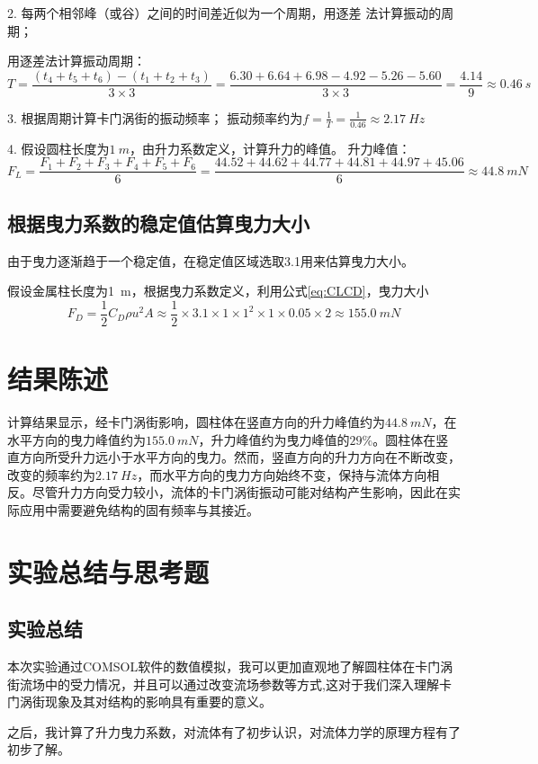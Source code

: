 \documentclass[a4paper,zihao=5,UTF8,fontset=fandol]{phyreport}
\begin{document}
2. 每两个相邻峰（或谷）之间的时间差近似为一个周期，用逐差
法计算振动的周期；

用逐差法计算振动周期：
$$T=\frac{(t_4+t_5+t_6)-(t_1+t_2+t_3)}{3\times3}=\frac{6.30+6.64+6.98-4.92-5.26-5.60}{3\times3}=\frac{4.14}{9}\approx\qty{0.46}{s}$$

3. 根据周期计算卡门涡街的振动频率；
振动频率约为$f=\frac{1}{T}=\frac{1}{0.46}\approx\qty{2.17}{Hz}$

4. 假设圆柱长度为$\qty{1}{m}$，由升力系数定义，计算升力的峰值。
升力峰值：$$F_L=\frac{F_1+F_2+F_3+F_4+F_5+F_6}{6}=\frac{44.52+44.62+44.77+44.81+44.97+45.06}{6}\approx\qty{44.8}{mN}$$

\subsection{根据曳力系数的稳定值估算曳力大小}
由于曳力逐渐趋于一个稳定值，在稳定值区域选取3.1用来估算曳力大小。

假设金属柱长度为\qty{1}{m}，根据曳力系数定义，利用公式\ref{eq:CLCD}，曳力大小
$$F_D=\frac{1}{2}C_D \rho u^2 A\approx\frac{1}{2}\times3.1\times1\times1^2\times1\times0.05\times2\approx\qty{155.0}{mN}$$


\longLine
\section{结果陈述}
计算结果显示，经卡门涡街影响，圆柱体在竖直方向的升力峰值约为$\qty{44.8}{mN}$，在水平方向的曳力峰值约为$\qty{155.0}{mN}$，升力峰值约为曳力峰值的$29\%$。圆柱体在竖直方向所受升力远小于水平方向的曳力。然而，竖直方向的升力方向在不断改变，改变的频率约为$\qty{2.17}{Hz}$，而水平方向的曳力方向始终不变，保持与流体方向相反。尽管升力方向受力较小，流体的卡门涡街振动可能对结构产生影响，因此在实际应用中需要避免结构的固有频率与其接近。

\longLine
\section{实验总结与思考题}
\subsection{实验总结}
本次实验通过COMSOL软件的数值模拟，我可以更加直观地了解圆柱体在卡门涡街流场中的受力情况，并且可以通过改变流场参数等方式,这对于我们深入理解卡门涡街现象及其对结构的影响具有重要的意义。

之后，我计算了升力曳力系数，对流体有了初步认识，对流体力学的原理方程有了初步了解。
\end{document}
